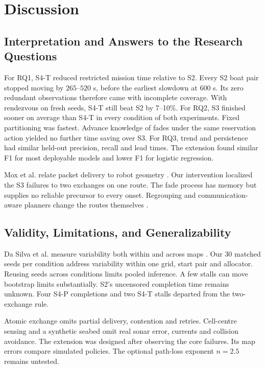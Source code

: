 \section{Discussion}
\subsection{Interpretation and Answers to the Research Questions}
For RQ1, S4-T reduced restricted mission time relative to S2. Every S2 boat pair stopped moving by $265$--$520$ s, before the earliest slowdown at $600$ s. Its zero redundant observations therefore came with incomplete coverage. With rendezvous on fresh seeds, S4-T still beat S2 by 7--10\%. For RQ2, S3 finished sooner on average than S4-T in every condition of both experiments. Fixed partitioning was fastest. Advance knowledge of fades under the same reservation action yielded no further time saving over S3. For RQ3, trend and persistence had similar held-out precision, recall and lead times. The extension found similar F1 for most deployable models and lower F1 for logistic regression.

Mox et al. relate packet delivery to robot geometry \cite{mox2024opportunistic}. Our intervention localized the S3 failures to two exchanges on one route. The fade process has memory but supplies no reliable precursor to every onset. Regrouping and communication-aware planners change the routes themselves \cite{bramblett2023epistemic,gordon2026communication}.

\subsection{Validity, Limitations, and Generalizability}
Da Silva et al. measure variability both within and across maps \cite{dasilva2024rendezvous}. Our 30 matched seeds per condition address variability within one grid, start pair and allocator. Reusing seeds across conditions limits pooled inference. A few stalls can move bootstrap limits substantially. S2's uncensored completion time remains unknown. Four S4-P completions and two S4-T stalls departed from the two-exchange rule.

Atomic exchange omits partial delivery, contention and retries. Cell-centre sensing and a synthetic seabed omit real sonar error, currents and collision avoidance. The extension was designed after observing the core failures. Its map errors compare simulated policies. The optional path-loss exponent $n=2.5$ remains untested.

